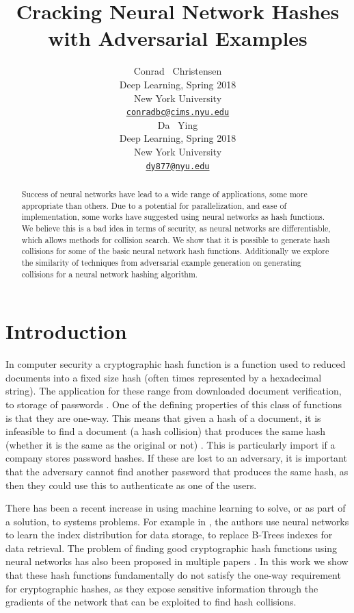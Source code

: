 \documentclass{article}
\title{Cracking Neural Network Hashes with Adversarial Examples}
\author{
  Conrad ~Christensen\\
  Deep Learning, Spring 2018\\
  New York University\\
  \href{mailto:conradbc@cims.nyu.edu}{\texttt{conradbc@cims.nyu.edu}} \\
  \And
  Da ~Ying\\
  Deep Learning, Spring 2018\\
  New York University\\
  \href{mailto:dy877@nyu.edu}{\texttt{dy877@nyu.edu}}
}
\begin{document}

\maketitle

\begin{abstract}
    Success of neural networks have lead to a wide range of applications, some
    more appropriate than others. Due to a potential for parallelization, and
    ease of implementation, some works have suggested using neural networks as
    hash functions.  We believe this is a bad idea in terms of security, as
    neural networks are differentiable, which allows methods for collision
    search. We show that it is possible to generate hash collisions for some of
    the basic neural network hash functions. Additionally we explore the
    similarity of techniques from adversarial example generation on
    generating collisions for a neural network hashing algorithm.
\end{abstract}

\section{Introduction}
In computer security a cryptographic hash function is a function used to
reduced documents into a fixed size hash (often times represented by a
hexadecimal string).  The application for these range from downloaded document
verification, to storage of passwords \cite{crypoHash}. One of the defining
properties of this class of functions is that they are one-way. This means that
given a hash of a document, it is infeasible to find a document (a hash
collision) that produces the same hash (whether it is the same as the original
or not) \cite{crypoHash}.  This is particularly import if a company stores
password hashes. If these are lost to an adversary, it is important that the
adversary cannot find another password that produces the same hash, as then
they could use this to authenticate as one of the users.

There has been a recent increase in using machine learning to solve, or as part
of a solution, to systems problems. For example in \cite{learnedIndex}, the
authors use neural networks to learn the index distribution for data storage,
to replace B-Trees indexes for data retrieval. The problem of finding good
cryptographic hash functions using neural networks has also been proposed in multiple papers
\cite{hash1, hash2}. In this work we show that these hash functions
fundamentally do not satisfy the one-way requirement for cryptographic hashes,
as they expose sensitive information through the gradients of the network that
can be exploited to find hash collisions.
\end{document}
